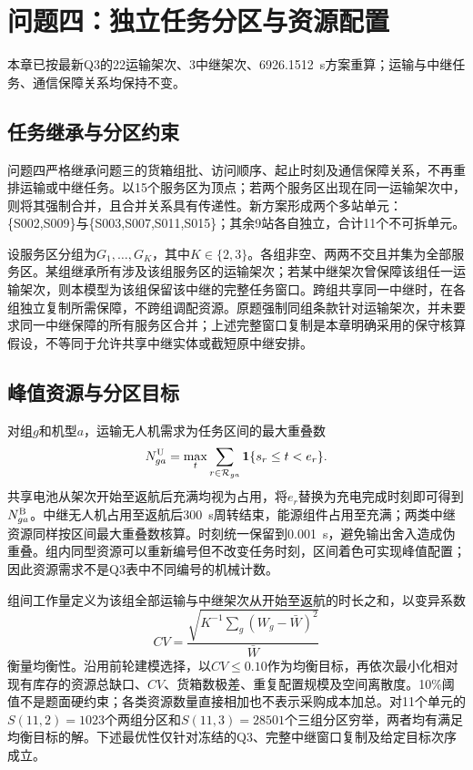 \section{问题四：独立任务分区与资源配置}
本章已按最新Q3的22运输架次、3中继架次、6926.1512~s方案重算；运输与中继任务、通信保障关系均保持不变。

\subsection{任务继承与分区约束}

问题四严格继承问题三的货箱组批、访问顺序、起止时刻及通信保障关系，不再重排运输或中继任务。以15个服务区为顶点；若两个服务区出现在同一运输架次中，则将其强制合并，且合并关系具有传递性。新方案形成两个多站单元：\{S002,\allowbreak S009\}与\{S003,\allowbreak S007,\allowbreak S011,\allowbreak S015\}；其余9站各自独立，合计11个不可拆单元。

设服务区分组为$G_1,\ldots,G_K$，其中$K\in\{2,3\}$。各组非空、两两不交且并集为全部服务区。某组继承所有涉及该组服务区的运输架次；若某中继架次曾保障该组任一运输架次，则本模型为该组保留该中继的完整任务窗口。跨组共享同一中继时，在各组独立复制所需保障，不跨组调配资源。原题强制同组条款针对运输架次，并未要求同一中继保障的所有服务区合并；上述完整窗口复制是本章明确采用的保守核算假设，不等同于允许共享中继实体或截短原中继安排。

\subsection{峰值资源与分区目标}

对组$g$和机型$a$，运输无人机需求为任务区间的最大重叠数
\[
N^{\rm U}_{ga}=\max_t\sum_{r\in\mathcal R_{ga}}
\mathbf 1\{s_r\le t<e_r\}.
\]
共享电池从架次开始至返航后充满均视为占用，将$e_r$替换为充电完成时刻即可得到$N^{\rm B}_{ga}$。中继无人机占用至返航后300~s周转结束，能源组件占用至充满；两类中继资源同样按区间最大重叠数核算。时刻统一保留到0.001~s，避免输出舍入造成伪重叠。组内同型资源可以重新编号但不改变任务时刻，区间着色可实现峰值配置；因此资源需求不是Q3表中不同编号的机械计数。

组间工作量定义为该组全部运输与中继架次从开始至返航的时长之和，以变异系数
\[
CV=\frac{\sqrt{K^{-1}\sum_g(W_g-\bar W)^2}}{\bar W}
\]
衡量均衡性。沿用前轮建模选择，以$CV\le0.10$作为均衡目标，再依次最小化相对现有库存的资源总缺口、$CV$、货箱数极差、重复配置规模及空间离散度。10\%阈值不是题面硬约束；各类资源数量直接相加也不表示采购成本加总。对11个单元的$S(11,2)=1023$个两组分区和$S(11,3)=28501$个三组分区穷举，两者均有满足均衡目标的解。下述最优性仅针对冻结的Q3、完整中继窗口复制及给定目标次序成立。

